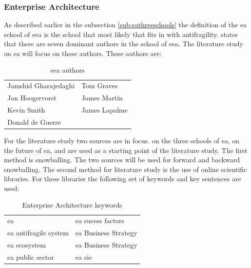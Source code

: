 \subsubsection{Enterprise Architecture}
\label{subsub:enterprisearchitecture}
As described earlier in the subsection \ref{sub:eathreeschools} the definition of the \acrfull{ea} school of \acrfull{eea} is the school that most likely that fits in with \gls{antifragility}. \textcite[p. 42]{Lapalme2012} states that there are seven dominant authors in the school of \acrshort{eea}.  The literature study on \acrshort{ea} will focus on these authors. These authors are:
\begin{table}[H]
	\centering
	\begin{tabular}{p{}p{}}
		\toprule
		Jamshid Gharajedaghi & Tom Graves \\%
		Jan Hoogervorst	& James Martin \\%
		Kevin Smith & James Lapalme\\%
		Donald de Guerre &  \\%
		\bottomrule
	\end{tabular}
	\caption{\acrfull{eea} authors \parencite[p.~42]{Lapalme2012}}
	\label{tab:eeaauthors}
\end{table}
For the literature study two sources are in focus. \textcite{Lapalme2012} on the three schools of \acrshort{ea}, \textcite{Lapalme2016} on the future of \acrshort{ea}, and \textcite{Graves2008} are used as a starting point of the literature study. The first method is snowballing. The two sources will be used for forward and backward snowballing. The second method for literature study is the use of online scientific libraries. For these libraries the following set of keywords and key sentences are used:
\begin{table}[H]
	\centering
	\begin{tabular}{p{}p{}}
		\toprule
		\acrlong{ea} & \acrlong{ea} sucess factors\\%
		\acrlong{ea} \gls{antifragile} system	& \acrlong{ea} Business Strategy\\%
		\acrlong{ea} ecosystem & \acrlong{ea} Business Strategy\\%
		\acrlong{ea} public sector & \acrlong{ea} \acrlong{sie} \\%
		\bottomrule
	\end{tabular}
	\caption{Enterprise Architecture keywords}
	\label{tab:enterprisearchitecturekeywords}
\end{table}
